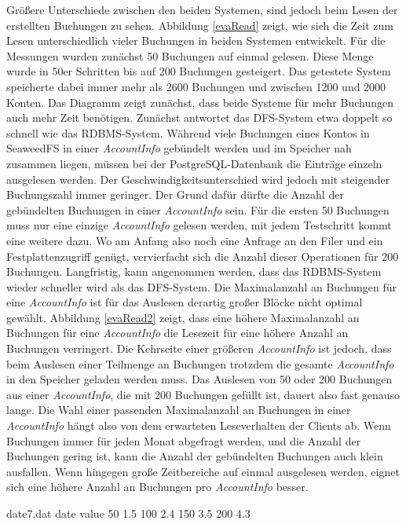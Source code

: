 \documentclass[12pt,oneside,a4paper,parskip]{scrbook}
\begin{document}
Größere Unterschiede zwischen den beiden Systemen, sind jedoch beim Lesen der erstellten Buchungen zu sehen. Abbildung \ref{evaRead} zeigt, wie sich die Zeit zum Lesen unterschiedlich vieler Buchungen in beiden Systemen entwickelt. Für die Messungen wurden zunächst 50 Buchungen auf einmal gelesen. Diese Menge wurde in 50er Schritten bis auf 200 Buchungen gesteigert. Das getestete System speicherte dabei immer mehr als 2600 Buchungen und zwischen 1200 und 2000 Konten. Das Diagramm zeigt zunächst, dass beide Systeme für mehr Buchungen auch mehr Zeit benötigen. Zunächst antwortet das DFS-System etwa doppelt so schnell wie das RDBMS-System. Während viele Buchungen eines Kontos in SeaweedFS in einer \textit{AccountInfo} gebündelt werden und im Speicher nah zusammen liegen, müssen bei der PostgreSQL-Datenbank die Einträge einzeln ausgelesen werden. Der Geschwindigkeitsunterschied wird jedoch mit steigender Buchungszahl immer geringer. Der Grund dafür dürfte die Anzahl der gebündelten Buchungen in einer \textit{AccountInfo} sein. Für die ersten 50 Buchungen muss nur eine einzige \textit{AccountInfo} gelesen werden, mit jedem Testschritt kommt eine weitere dazu. Wo am Anfang also noch eine Anfrage an den Filer und ein Festplattenzugriff genügt, vervierfacht sich die Anzahl dieser Operationen für 200 Buchungen. Langfristig, kann angenommen werden, dass das RDBMS-System wieder schneller wird als das DFS-System. Die Maximalanzahl an Buchungen für eine \textit{AccountInfo} ist für das Auslesen derartig großer Blöcke nicht optimal gewählt. Abbildung \ref{evaRead2} zeigt, dass eine höhere Maximalanzahl an Buchungen für eine \textit{AccountInfo} die Lesezeit für eine höhere Anzahl an Buchungen verringert. 
Die Kehrseite einer größeren \textit{AccountInfo} ist jedoch, dass beim Auslesen einer Teilmenge an Buchungen trotzdem die gesamte \textit{AccountInfo} in den Speicher geladen werden muss. Das Auslesen von 50 oder 200 Buchungen aus einer \textit{AccountInfo}, die mit 200 Buchungen gefüllt ist, dauert also fast genauso lange. Die Wahl einer passenden Maximalanzahl an Buchungen in einer \textit{AccountInfo} hängt also von dem erwarteten Leseverhalten der Clients ab. Wenn Buchungen immer für jeden Monat abgefragt werden, und die Anzahl der Buchungen gering ist, kann die Anzahl der gebündelten Buchungen auch klein ausfallen. Wenn hingegen große Zeitbereiche auf einmal ausgelesen werden, eignet sich eine höhere Anzahl an Buchungen pro \textit{AccountInfo} besser.


\begin{filecontents}{date7.dat}
date  value
50      1.5
100     2.4
150     3.5
200     4.3
\end{filecontents}
\end{document}
